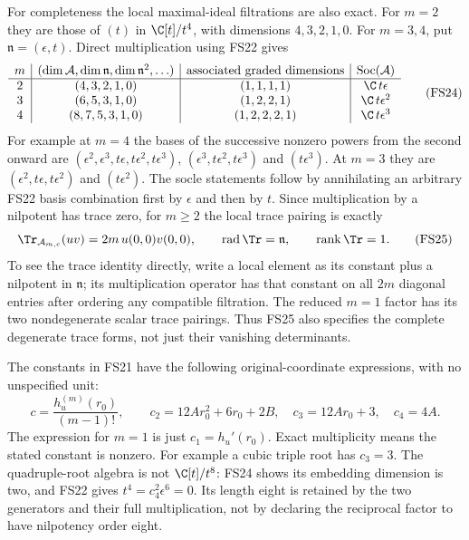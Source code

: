 For completeness the local maximal-ideal filtrations are
also exact. For $m=2$ they are those of $(t)$ in
$\C[t]/t^4$, with dimensions $4,3,2,1,0$.
For $m=3,4$, put $\mathfrak n=(\epsilon,t)$. Direct
multiplication using FS22 gives
\begin{equation}
\begin{array}{c|c|c|c}
m&(\dim\mathcal A,\dim\mathfrak n,\dim\mathfrak n^2,\ldots)
 &\text{associated graded dimensions}&\operatorname{Soc}(\mathcal A)\\\hline
2&(4,3,2,1,0)&(1,1,1,1)&\C\,t\epsilon\\
3&(6,5,3,1,0)&(1,2,2,1)&\C\,t\epsilon^2\\
4&(8,7,5,3,1,0)&(1,2,2,2,1)&\C\,t\epsilon^3
\end{array}
\tag{FS24}
\end{equation}
For example at $m=4$ the bases of the successive nonzero
powers from the second onward are
$(\epsilon^2,\epsilon^3,t\epsilon,t\epsilon^2,t\epsilon^3)$,
$(\epsilon^3,t\epsilon^2,t\epsilon^3)$ and $(t\epsilon^3)$.
At $m=3$ they are $(\epsilon^2,t\epsilon,t\epsilon^2)$
and $(t\epsilon^2)$. The socle statements follow by
annihilating an arbitrary FS22 basis combination first by
$\epsilon$ and then by $t$.
Since multiplication by a nilpotent has trace zero,
for $m\ge2$ the local trace pairing is exactly
\begin{equation}
\Tr_{\mathcal A_{m,c}}(uv)=2m\,u(0,0)v(0,0),\qquad
\operatorname{rad}\Tr=\mathfrak n,\qquad
\operatorname{rank}\Tr=1 .
\tag{FS25}
\end{equation}
To see the trace identity directly, write a local element
as its constant plus a nilpotent in $\mathfrak n$; its
multiplication operator has that constant on all $2m$
diagonal entries after ordering any compatible filtration.
The reduced $m=1$ factor has its two nondegenerate scalar
trace pairings. Thus FS25 also specifies the complete
degenerate trace forms, not just their vanishing determinants.

The constants in FS21 have the following original-coordinate
expressions, with no unspecified unit:
\begin{equation}
c=\frac{h_u^{(m)}(r_0)}{(m-1)!},\qquad
c_2=12Ar_0^2+6r_0+2B,\quad
c_3=12Ar_0+3,\quad c_4=4A .
\tag{FS26}
\end{equation}
The expression for $m=1$ is just $c_1=h_u'(r_0)$.
Exact multiplicity means the stated constant is nonzero.
For example a cubic triple root has $c_3=3$.
The quadruple-root algebra is not $\C[t]/t^8$:
FS24 shows its embedding dimension is two, and FS22 gives
$t^4=c_4^2\epsilon^6=0$. Its length eight is retained by
the two generators and their full multiplication, not by
declaring the reciprocal factor to have nilpotency order eight.

